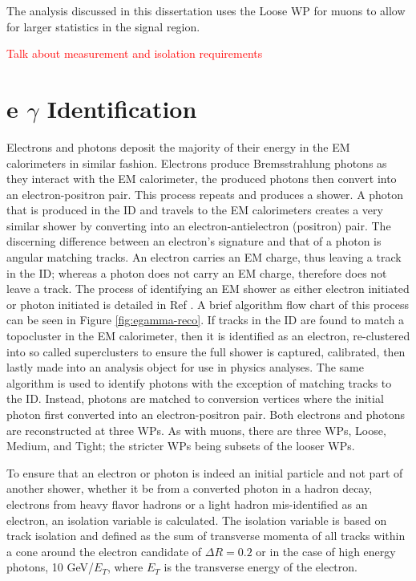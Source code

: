 		The analysis discussed in this dissertation uses the Loose WP for muons to allow for larger statistics in the signal region.

		\textcolor{red}{Talk about \pt measurement and isolation requirements}


	\section{e $\gamma$ Identification}\label{sec:reco-egamma}
		Electrons and photons deposit the majority of their energy in the \gls{EM} calorimeters in similar fashion. Electrons produce Bremsstrahlung photons as they interact with the \gls{EM} calorimeter, the produced photons then convert into an electron-positron pair. This process repeats and produces a shower. A photon that is produced in the \gls{ID} and travels to the \gls{EM} calorimeters creates a very similar shower by converting into an electron-antielectron (positron) pair. The discerning difference between an electron's signature and that of a photon is angular matching tracks. An electron carries an \gls{EM} charge, thus leaving a track in the \gls{ID}; whereas a photon does not carry an \gls{EM} charge, therefore does not leave a track. The process of identifying an \gls{EM} shower as either electron initiated or photon initiated is detailed in Ref \cite{electron-perf}. A brief algorithm flow chart of this process can be seen in Figure \ref{fig:egamma-reco}. If tracks in the \gls{ID} are found to match a topocluster in the \gls{EM} calorimeter, then it is identified as an electron, re-clustered into so called superclusters to ensure the full shower is captured, calibrated, then lastly made into an analysis object for use in physics analyses. The same algorithm is used to identify photons with the exception of matching tracks to the \gls{ID}. Instead, photons are matched to conversion vertices where the initial photon first converted into an electron-positron pair. Both electrons and photons are reconstructed at three WPs. As with muons, there are three WPs, Loose, Medium, and Tight; the stricter WPs being subsets of the looser WPs.

		To ensure that an electron or photon is indeed an initial particle and not part of another shower, whether it be from a converted photon in a hadron decay, electrons from heavy flavor hadrons or a light hadron mis-identified as an electron, an isolation variable is calculated. The isolation variable is based on track isolation and defined as the sum of transverse momenta of all tracks within a cone around the electron candidate of $\Delta R = 0.2$ or in the case of high energy photons, 10 GeV/$E_T$, where $E_T$ is the transverse energy of the electron.

